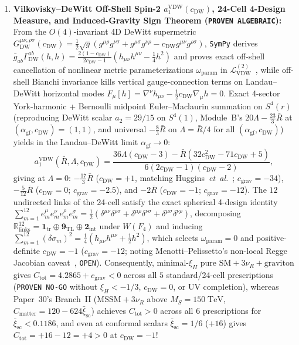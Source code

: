 \documentclass[11pt,a4paper]{article}
\begin{document}
\begin{enumerate}
\item \textbf{Vilkovisky--DeWitt Off-Shell Spin-2 $a_1^{\mathrm{VDW}}(c_{\mathrm{DW}})$, 24-Cell 4-Design Measure, and Induced-Gravity Sign Theorem (\texttt{PROVEN ALGEBRAIC}):} From the $O(4)$-invariant 4D DeWitt supermetric $G_{\mathrm{DW}}^{\mu\nu,\rho\sigma}(c_{\mathrm{DW}})=\frac{1}{2}\sqrt{g}(g^{\mu\rho}g^{\nu\sigma}+g^{\mu\sigma}g^{\nu\rho}-c_{\mathrm{DW}}g^{\mu\nu}g^{\rho\sigma})$, \texttt{SymPy} derives $\bar g_{ab}\Gamma_{\mathrm{DW}}^{ab}(h,h)=\frac{2(1-c_{\mathrm{DW}})}{2c_{\mathrm{DW}}-1}(h_{\mu\nu}h^{\mu\nu}-\frac{1}{4}h^2)$ and proves exact off-shell cancellation of nonlinear metric parameterizations $\omega_{\mathrm{param}}$ in $\mathcal{L}_{\mathrm{VDW}}^{(2)}$~\cite{Vilkovisky1984}, while off-shell Bianchi invariance kills vertical gauge-connection terms on Landau--DeWitt horizontal modes $F_\mu[h]=\nabla^\nu h_{\mu\nu}-\frac{1}{2}c_{\mathrm{DW}}\nabla_\mu h=0$. Exact 4-sector York-harmonic + Bernoulli midpoint Euler--Maclaurin summation on $S^4(r)$ (reproducing DeWitt scalar $a_2=29/15$ on $S^4(1)$, Module~B's $20\Lambda-\frac{23}{3}\bar R$ at $(\alpha_{\mathrm{gf}},c_{\mathrm{DW}})=(1,1)$, and universal $-\frac{8}{3}\bar R$ on $\Lambda=\bar R/4$ for all $(\alpha_{\mathrm{gf}},c_{\mathrm{DW}})$) yields in the Landau--DeWitt limit $\alpha_{\mathrm{gf}}\to 0$:
\[
a_1^{\mathrm{VDW}}(\bar R,\Lambda,c_{\mathrm{DW}}) = \frac{36\Lambda(c_{\mathrm{DW}}-3) - \bar R(32c_{\mathrm{DW}}^2 - 71c_{\mathrm{DW}} + 5)}{6(2c_{\mathrm{DW}}-1)(c_{\mathrm{DW}}-2)},
\]
giving at $\Lambda=0$: $-\frac{17}{3}\bar R$ ($c_{\mathrm{DW}}=+1$, matching Huggins~\textit{et~al.}~\cite{Huggins1987}; $c_{\mathrm{grav}}=-34$), $-\frac{5}{12}\bar R$ ($c_{\mathrm{DW}}=0$; $c_{\mathrm{grav}}=-2.5$), and $-2\bar R$ ($c_{\mathrm{DW}}=-1$; $c_{\mathrm{grav}}=-12$). The $12$ undirected links of the 24-cell satisfy the exact spherical 4-design identity $\sum_{m=1}^{12}e_m^\mu e_m^\nu e_m^\rho e_m^\sigma = \frac{1}{2}(\delta^{\mu\nu}\delta^{\rho\sigma}+\delta^{\mu\rho}\delta^{\nu\sigma}+\delta^{\mu\sigma}\delta^{\nu\rho})$, decomposing $\mathbb{R}^{12}_{\mathrm{links}}=\mathbf{1}_{\mathrm{tr}}\oplus\mathbf{9}_{\mathrm{TL}}\oplus\mathbf{2}_{\mathrm{int}}$ under $W(F_4)$ and inducing $\sum_{m=1}^{12}(\delta\sigma_m)^2 = \frac{1}{4}(h_{\mu\nu}h^{\mu\nu}+\frac{1}{2}h^2)$, which selects $\omega_{\mathrm{param}}=0$ and positive-definite $c_{\mathrm{DW}}=-1$ ($c_{\mathrm{grav}}=-12$; noting Menotti--Pelissetto's non-local Regge Jacobian caveat~\cite{MenottiPelissetto1987}, \texttt{OPEN}). Consequently, minimal-$\xi_H$ pure $\mathrm{SM}+3\nu_R+\text{graviton}$ gives $C_{\mathrm{tot}}=4.2865+c_{\mathrm{grav}}<0$ across all $5$ standard/24-cell prescriptions (\texttt{PROVEN NO-GO} without $\xi_H<-1/3$, $c_{\mathrm{DW}}=0$, or UV completion), whereas Paper~30's Branch~II ($\mathrm{MSSM}+3\nu_R$ above $M_S=150\;\mathrm{TeV}$, $C_{\mathrm{matter}}=120-624\bar\xi_{\mathrm{sc}}$) achieves $C_{\mathrm{tot}}>0$ across all $6$ prescriptions for $\bar\xi_{\mathrm{sc}}<0.1186$, and even at conformal scalars $\bar\xi_{\mathrm{sc}}=1/6$ ($+16$) gives $C_{\mathrm{tot}}=+16-12=+4>0$ at $c_{\mathrm{DW}}=-1$!

\end{enumerate}
\end{document}
